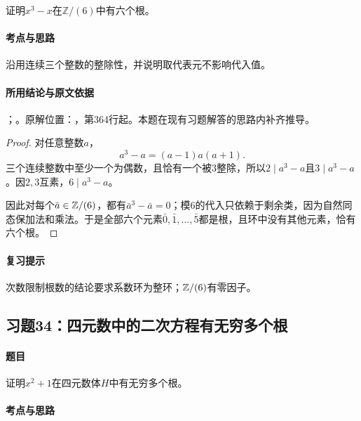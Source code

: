 证明$x^3-x$在$\mathbb Z/(6)$中有六个根。

\paragraph{考点与思路}

沿用连续三个整数的整除性，并说明取代表元不影响代入值。

\paragraph{所用结论与原文依据}

；。原解位置：，第364行起。本题在现有习题解答的思路内补齐推导。


\begin{proof}

对任意整数$a$，
\[
a^3-a=(a-1)a(a+1).
\]
三个连续整数中至少一个为偶数，且恰有一个被$3$整除，所以$2\mid a^3-a$且$3\mid a^3-a$。因$2,3$互素，$6\mid a^3-a$。

因此对每个$\bar a\in\mathbb Z/(6)$，都有$\bar a^3-\bar a=0$；模$6$的代入只依赖于剩余类，因为自然同态保加法和乘法。于是全部六个元素$\bar0,\bar1,\ldots,\bar5$都是根，且环中没有其他元素，恰有六个根。

\end{proof}

\paragraph{复习提示}

次数限制根数的结论要求系数环为整环；$\mathbb Z/(6)$有零因子。



\subsection{习题34：四元数中的二次方程有无穷多个根}

\label{ex:3:34}

\paragraph{题目}

证明$x^2+1$在四元数体$H$中有无穷多个根。

\paragraph{考点与思路}

